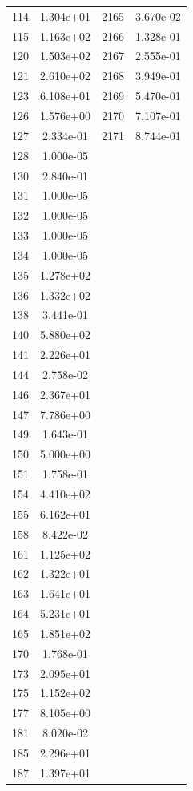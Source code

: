 \documentclass[12pt]{article}
\begin{document}
\begin{longtable}{@{}cccc@{}}
114 & 1.304e+01 & 2165 & 3.670e-02 \\
115 & 1.163e+02 & 2166 & 1.328e-01 \\
120 & 1.503e+02 & 2167 & 2.555e-01 \\
121 & 2.610e+02 & 2168 & 3.949e-01 \\
123 & 6.108e+01 & 2169 & 5.470e-01 \\
126 & 1.576e+00 & 2170 & 7.107e-01 \\
127 & 2.334e-01 & 2171 & 8.744e-01 \\
128 & 1.000e-05 &  &  \\
130 & 2.840e-01 &  &  \\
131 & 1.000e-05 &  &  \\
132 & 1.000e-05 &  &  \\
133 & 1.000e-05 &  &  \\
134 & 1.000e-05 &  &  \\
135 & 1.278e+02 &  &  \\
136 & 1.332e+02 &  &  \\
138 & 3.441e-01 &  &  \\
140 & 5.880e+02 &  &  \\
141 & 2.226e+01 &  &  \\
144 & 2.758e-02 &  &  \\
146 & 2.367e+01 &  &  \\
147 & 7.786e+00 &  &  \\
149 & 1.643e-01 &  &  \\
150 & 5.000e+00 &  &  \\
151 & 1.758e-01 &  &  \\
154 & 4.410e+02 &  &  \\
155 & 6.162e+01 &  &  \\
158 & 8.422e-02 &  &  \\
161 & 1.125e+02 &  &  \\
162 & 1.322e+01 &  &  \\
163 & 1.641e+01 &  &  \\
164 & 5.231e+01 &  &  \\
165 & 1.851e+02 &  &  \\
170 & 1.768e-01 &  &  \\
173 & 2.095e+01 &  &  \\
175 & 1.152e+02 &  &  \\
177 & 8.105e+00 &  &  \\
181 & 8.020e-02 &  &  \\
185 & 2.296e+01 &  &  \\
187 & 1.397e+01 &  &  \\

\end{longtable}
\end{document}
